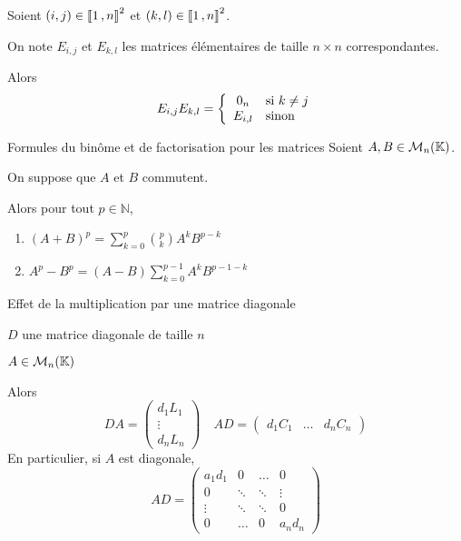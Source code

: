     \begin{coro}{}{}
        Soient $(i,j) \in \left\llbracket 1 \, , n \right\rrbracket^2$ et $(k,l) \in \left\llbracket 1 \, , n \right\rrbracket^2$.
        
        On note $E_{i,j}$ et $E_{k,l}$ les matrices élémentaires de taille $n \times n$ correspondantes. 

        Alors \[ E_{i,j} E_{k,l} = \sisinon{0_n}{k \neq j}{E_{i,l}} \]
    \end{coro}

    \begin{theo}{Formules du binôme et de factorisation pour les matrices}{}
        Soient $A,B \in \mathcal{M}_{n}(\mathbb{K})$.
        
        On suppose que $A$ et $B$ commutent.

        Alors pour tout $p \in \mathbb{N}$, 
        \begin{enumerate}
            \item $(A+B)^p = \sum\limits_{k=0}^p \binom{p}{k} A^k B^{p-k}$
            \item $A^p - B^p = (A-B) \sum\limits_{k=0}^{p-1} A^k B^{p-1-k}$
        \end{enumerate}
    \end{theo}

    \begin{prop}{Effet de la multiplication par une matrice diagonale}{}
        \begin{soient}
            \item $D$ une matrice diagonale de taille $n$
            \item $A \in \mathcal{M}_{n}(\mathbb{K})$
        \end{soient}

        Alors \[ DA = \begin{pmatrix}
            d_1 L_1 \\
            \vdots \\
            d_n L_n
        \end{pmatrix} \quad AD = \begin{pmatrix}
            d_1 C_1 & \ldots & d_n C_n 
        \end{pmatrix} \]
        En particulier, si $A$ est diagonale, \[ AD = \begin{pmatrix}
            a_1 d_1 & 0 & \ldots & 0 \\
            0 & \ddots & \ddots & \vdots \\
            \vdots & \ddots & \ddots & 0 \\
            0 & \ldots & 0 & a_n d_n
            \end{pmatrix} \] 
    \end{prop}

